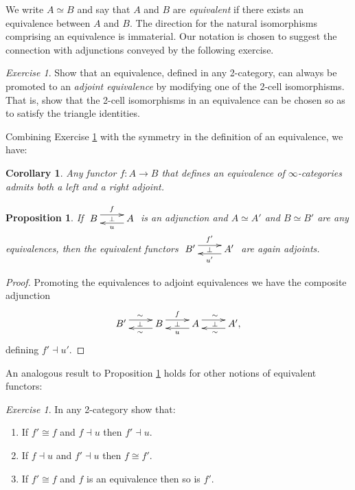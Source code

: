 \documentclass[12pt,reqno]{amsart}
\theoremstyle{plain}
\newtheorem{cor}[thm]{Corollary}
\newtheorem{prop}[thm]{Proposition}
\theoremstyle{definition}
\theoremstyle{remark}
\newtheorem{exs}[thm]{Exercise}
\numberwithin{equation}{subsection}
\begin{document}
We write $A \simeq B$ and say that $A$ and $B$ are \emph{equivalent} if there exists an equivalence between $A$ and $B$. The direction for the natural isomorphisms comprising an equivalence is immaterial. Our notation is chosen to suggest the connection with adjunctions conveyed by the following exercise.

\begin{exs}\label{exs:adjoint-equivalence} Show that an equivalence, defined in any 2-category, can always be promoted to an \emph{adjoint equivalence} by modifying one of the 2-cell isomorphisms. That is, show that the 2-cell isomorphisms in an equivalence can be chosen so as to satisfy the triangle identities.
\end{exs}

Combining Exercise \ref{exs:adjoint-equivalence} with the symmetry in the definition of an equivalence, we have:

\begin{cor}\label{cor:equivs-are-adjoints} Any functor $f \colon A \to B$ that defines an equivalence of $\infty$-categories admits both a left and a right adjoint.
\end{cor}


\begin{prop}\label{prop:equiv-invar-adjunction} If $\xymatrix{ B \ar@<1ex>[r]^f \ar@{}[r]|\perp & A \ar@<1ex>[l]^u}$ is an adjunction and $A \simeq A'$ and $B \simeq B'$ are any equivalences, then the equivalent functors $\xymatrix{ B' \ar@<1ex>[r]^{f'} \ar@{}[r]|\perp & A' \ar@<1ex>[l]^{u'}}$ are again adjoints.
\end{prop}
\begin{proof}
Promoting the equivalences to adjoint equivalences we have the composite adjunction
\[ \xymatrix{ B' \ar@<1ex>[r]^\sim \ar@{}[r]|\perp & B \ar@<1ex>[r]^f \ar@<1ex>[l]^\sim \ar@{}[r]|\perp & A \ar@<1ex>[r]^\sim \ar@{}[r]|\perp \ar@<1ex>[l]^u & A' \ar@<1ex>[l]^\sim,}\] defining $f' \dashv u'$.
\end{proof}

An analogous result to Proposition \ref{prop:equiv-invar-adjunction} holds for other notions of equivalent functors:

\begin{exs}\label{exs:iso-invar-adjunction} In any 2-category show that:
\begin{enumerate}[label=(\roman*)]
\item If $f' \cong f$ and $f \dashv u$ then $f' \dashv u$.
\item If $f \dashv u$ and $f' \dashv u$ then $f \cong f'$.
\item If $f' \cong f$ and $f$ is an equivalence then so is $f'$.
\end{enumerate}
\end{exs}
\end{document}
